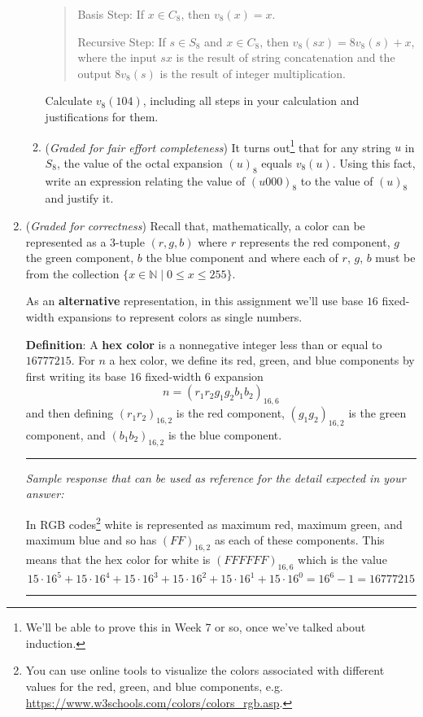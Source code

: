 \documentclass[12pt, oneside]{article}
\begin{document}
\begin{enumerate}
\begin{enumerate}
    \begin{quote}
    Basis Step: If $x \in C_8$, then $v_8 (x) = x$.
    
    Recursive Step: If $s \in S_8$ and $x \in C_8$, then $v_8 (sx) = 8v_8(s) + x$, where 
    the input $sx$ is the result of string concatenation and the output $8 v_8 (s)$
    is the result of integer multiplication.
    \end{quote}

    Calculate $v_8(104)$, including all steps in your calculation and justifications for them.

    \item ({\it Graded for fair effort completeness})
    It turns out\footnote{We'll be able to prove this in Week 7 or so, once
    we've talked about induction.} that for any string $u$ in $S_8$, the value of the 
    octal expansion $(u)_8$ equals $v_8(u)$. Using this fact, write an expression 
    relating the value of $(u000)_8$ to the value of $(u)_8$ and justify it. 
    \end{enumerate}
    
    
    \item ({\it Graded for correctness}) 
    Recall that, mathematically, a color can be represented as a 
    $3$-tuple $(r, g, b)$ where $r$
    represents the red component, $g$ the green component, $b$ the blue component 
    and where each of $r$, $g$, $b$ must be from the collection 
    $\{x \in \mathbb{N}\mid 0 \leq x \leq 255 \}$.
    
    As an {\bf alternative} representation, in this assignment
    we'll use base $16$ fixed-width expansions to represent colors
    as single numbers.
    
    {\bf Definition}: A {\bf hex color} is a nonnegative
    integer less than or equal to $16777215$. 
    For $n$ a hex color, we define its red, green, and blue components
    by first writing its base $16$ fixed-width $6$ expansion
    $$n = (r_1r_2g_1g_2b_1b_2)_{16,6}$$ and 
    then defining
    $(r_1r_2)_{16,2}$ is the red
    component, $(g_1g_2)_{16,2}$ is the green component, and $(b_1b_2)_{16,2}$ is the
    blue component.
    
    \newpage
    \rule{0.5\textwidth}{.4pt}

    {\it Sample response that can be used as reference for the detail expected 
    in your answer:} 
    
    In RGB codes\footnote{You can use online tools to visualize the colors associated
    with different values for the red, green, and blue components, 
    e.g. \url{https://www.w3schools.com/colors/colors_rgb.asp}. }
    white is represented as maximum red, maximum green, and maximum blue 
    and so has
    $(FF)_{16,2}$ as each of these components. This means that the hex color for white
    is $(FFFFFF)_{16,6}$ which is the value 
    \[
        15\cdot 16^5 + 15 \cdot 16^4 + 15 \cdot 16^3 + 15 \cdot 16^2 + 15 \cdot 16^1 + 15 \cdot 16^0 
        = 16^6 - 1 = 16777215
    \]
    \rule{0.5\textwidth}{.4pt}


\end{enumerate}
\end{document}
